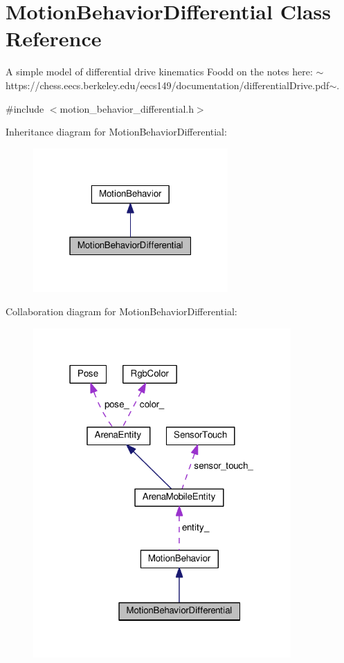 \hypertarget{classMotionBehaviorDifferential}{}\section{Motion\+Behavior\+Differential Class Reference}
\label{classMotionBehaviorDifferential}


A simple model of differential drive kinematics Foodd on the notes here\+: $\sim$https\+://chess.eecs.\+berkeley.\+edu/eecs149/documentation/differential\+Drive.pdf$\sim$.  




{\ttfamily \#include $<$motion\+\_\+behavior\+\_\+differential.\+h$>$}



Inheritance diagram for Motion\+Behavior\+Differential\+:\nopagebreak
\begin{figure}[H]
\begin{center}
\leavevmode
\includegraphics[width=211pt]{classMotionBehaviorDifferential__inherit__graph}
\end{center}
\end{figure}


Collaboration diagram for Motion\+Behavior\+Differential\+:\nopagebreak
\begin{figure}[H]
\begin{center}
\leavevmode
\includegraphics[width=279pt]{classMotionBehaviorDifferential__coll__graph}
\end{center}
\end{figure}
